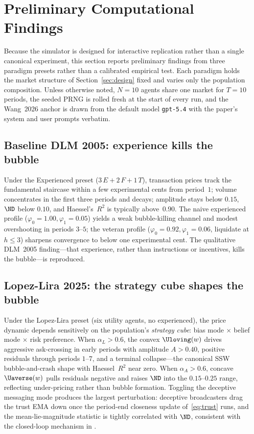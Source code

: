 \section{Preliminary Computational Findings}
\label{sec:results}

Because the simulator is designed for interactive replication
rather than a single canonical experiment, this section reports
preliminary findings from three paradigm presets rather than a
calibrated empirical test. Each paradigm holds the market
structure of Section~\ref{sec:design} fixed and varies only the
population composition. Unless otherwise noted, $N=10$ agents
share one market for $T=10$ periods, the seeded PRNG is rolled
fresh at the start of every run, and the Wang~2026 anchor is
drawn from the default model \texttt{gpt-5.4} with the paper's
system and user prompts verbatim.

\subsection{Baseline DLM 2005: experience kills the bubble}

Under the Experienced preset ($3\,E+2\,F+1\,T$), transaction prices
track the fundamental staircase within a few experimental cents from
period~$1$; volume concentrates in the first three periods and
decays; amplitude stays below $0.15$, $\ND$ below $0.10$, and
Haessel's~$R^2$ is typically above~$0.90$. The naive experienced
profile ($\varphi_0=1.00,\varphi_1=0.05$) yields a weak
bubble-killing channel and modest overshooting in periods $3$--$5$;
the veteran profile ($\varphi_0=0.92,\varphi_1=0.06$, liquidate at
$h\le 3$) sharpens convergence to below one experimental cent. The
qualitative DLM~2005 finding---that experience, rather than
instructions or incentives, kills the bubble---is reproduced.

\subsection{Lopez-Lira 2025: the strategy cube shapes the bubble}

Under the Lopez-Lira preset (six utility agents, no experienced),
the price dynamic depends sensitively on the population's
\emph{strategy cube}: bias mode $\times$ belief mode $\times$ risk
preference. When $\alpha_L>0.6$, the convex $\Uloving(w)$ drives
aggressive ask-crossing in early periods with amplitude $A>0.40$,
positive residuals through periods $1$--$7$, and a terminal
collapse---the canonical SSW bubble-and-crash shape with
Haessel~$R^2$ near zero. When $\alpha_A>0.6$, concave $\Uaverse(w)$
pulls residuals negative and raises $\ND$ into the $0.15$--$0.25$
range, reflecting under-pricing rather than bubble formation.
Toggling the deceptive messaging mode produces the largest
perturbation: deceptive broadcasters drag the trust EMA down once
the period-end closeness update of~\eqref{eq:trust} runs, and the
mean-lie-magnitude statistic is tightly correlated with $\ND$,
consistent with the closed-loop mechanism in
\citet{lopezlira2025llm}.

